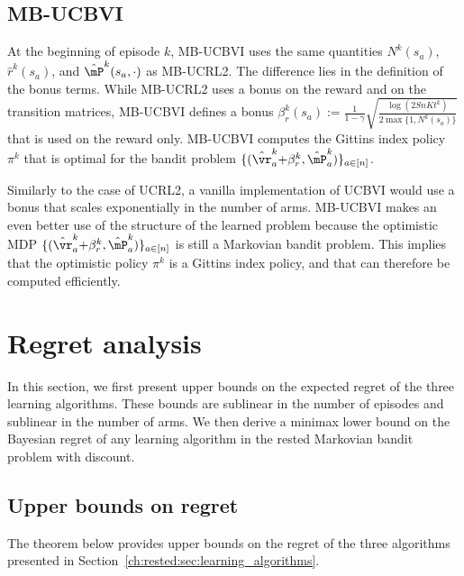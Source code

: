 \subsection{MB-UCBVI}

At the beginning of episode $k$, MB-UCBVI uses the same quantities $N^{k}(s_a)$, $\hat{r}^{k}(s_a)$, and $\hat{\mP}^{k}(s_a,\cdot)$ as MB-UCRL2. The difference lies in the definition of the bonus terms. While MB-UCRL2 uses a bonus on the reward and on the transition matrices, MB-UCBVI defines a bonus $\beta^{k}_r(s_a){:=}\frac{1}{1-\gamma}\sqrt{\frac{\log(2SnKt^k)}{2\max\{1,N^{k}(s_a)\}}}$ that is used on the reward only. MB-UCBVI computes the Gittins index policy $\pi^k$ that is optimal for the bandit problem $\{(\hat{\vr}^{k}_a {+}\beta^{k}_{r}, \hat{\mP}^{k}_a)\}_{a\in[n]}$. 

Similarly to the case of UCRL2, a vanilla implementation of UCBVI would use a bonus that scales exponentially in the number of arms. MB-UCBVI makes an even  better use of the structure of the learned problem because the optimistic MDP $\{(\hat{\vr}^{k}_a {+}\beta^{k}_{r}, \hat{\mP}^{k}_a)\}_{a\in[n]}$ is still a Markovian bandit problem. This implies that the optimistic policy $\pi^k$ is a Gittins index policy, and that can therefore be computed efficiently.

\section{Regret analysis}
\label{ch:rested:sec:analysis}

In this section, we first present upper bounds on the expected regret of the three learning algorithms. These bounds are sublinear in the number of episodes and sublinear in the number of arms. We then derive a minimax lower bound on the Bayesian regret of any learning algorithm in the rested Markovian bandit problem with discount. 

\subsection{Upper bounds on regret}
\label{ssec:upper_bound_psrl}

The theorem below provides upper bounds on the regret of the three algorithms presented in Section~\ref{ch:rested:sec:learning_algorithms}. %


